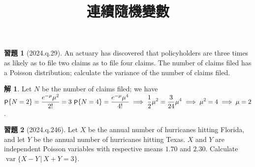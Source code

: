 \documentclass[12pt]{extarticle}
\newcommand{\ds}{\displaystyle}
\newcommand{\ie}{\;\Longrightarrow\;}
\DeclareMathOperator\prb{{\sf P}}
\DeclareMathOperator\var{var}
\theoremstyle{definition}
\newtheorem*{sol}{解}
\newtheorem*{exe}{習題}
\newcommand{\myline}{\noindent\makebox[\linewidth]{\rule{\paperwidth}{0.4pt}}}
\begin{document}
\title{\texorpdfstring{\vspace{-16mm} 連續隨機變數}{連續隨機變數}} 
\author{\vspace{-5em}}
\date{\vspace{-5em}}
\maketitle
\thispagestyle{firststyle}

\myline

\begin{exe}[2024.q.29]
  An actuary has discovered that policyholders are three times as likely as to file two claims as to file four claims. The number of claims filed has a Poisson distribution; calculate the variance of the number of claims filed.
\end{exe}

\begin{sol}
  Let $N$ be the number of claims filed; we have $\ds\prb\{N = 2\} = \frac{e^{-\mu}\mu^2}{2!} = 3\,\prb\{N = 4\} = \frac{e^{-\mu}\mu^4}{4!} \ie \frac{1}{2}\mu^2 = \frac{3}{24}\mu^4 \ie \mu^2 = 4 \ie \mu = 2$. 
\end{sol}

\begin{exe}[2024.q.246]
  Let $X$ be the annual number of hurricanes hitting Florida, and let $Y$ be the annual number of hurricanes hitting Texas. $X$ and $Y$ are independent Poisson variables with respective means $1.70$ and $2.30$. Calculate $\var\{X - Y\,|\,X + Y = 3\}$.
\end{exe}
\end{document}
